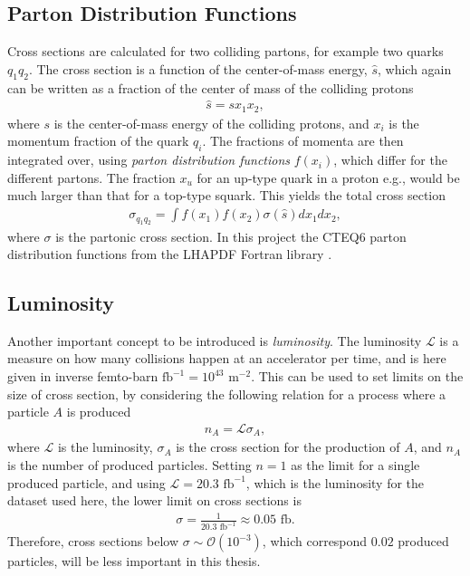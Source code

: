 \documentclass[twoside,english]{uiofysmaster}
\begin{document}
\subsection{Parton Distribution Functions}

Cross sections are calculated for two colliding partons, for example two quarks $q_1 q_2$. The cross section is a function of the center-of-mass energy, $\hat{s}$, which again can be written as a fraction of the center of mass of the colliding protons
\begin{align}
\hat{s} = s x_1 x_2,
\end{align}
where $s$ is the center-of-mass energy of the colliding protons, and $x_i$ is the momentum fraction of the quark $q_i$. The fractions of momenta are then integrated over, using \textit{parton distribution functions} $f(x_i)$, which differ for the different partons. The fraction $x_u$ for an up-type quark in a proton e.g., would be much larger than that for a top-type squark. This yields the total cross section
\begin{align}
\sigma_{q_1q_2} = \int f(x_1) f(x_2) \sigma(\hat{s}) dx_1 dx_2,
\end{align}
where $\sigma$ is the partonic cross section. In this project the CTEQ6 parton distribution functions from the LHAPDF Fortran library \cite{PhysRevD.78.013004}.

\subsection{Luminosity}

Another important concept to be introduced is \textit{luminosity}. The luminosity $\mathcal{L}$ is a measure on how many collisions happen at an accelerator per time, and is here given in inverse femto-barn $\text{fb}^{-1} = 10^{43} \text{ m}^{-2}$. This can be used to set limits on the size of cross section, by considering the following relation for a process where a particle $A$ is produced
\begin{align}
n_{A} = \mathcal{L} \sigma_{A} ,
\end{align}
where $\mathcal{L}$ is the luminosity, $\sigma_{A}$ is the cross section for the production of $A$, and $n_A$ is the number of produced particles. Setting $n=1$ as the limit for a single produced particle, and using $\mathcal{L} = 20.3 \text{ fb}^{-1}$, which is the luminosity for the dataset used here, the lower limit on cross sections is
\begin{align}
\sigma  = \frac{1}{20.3 \text{ fb}^{-1}} \approx 0.05 \text{ fb}.
\end{align}
Therefore, cross sections below $\sigma \sim \mathcal{O}(10^{-3})$, which correspond $0.02$ produced particles, will be less important in this thesis.
\end{document}
